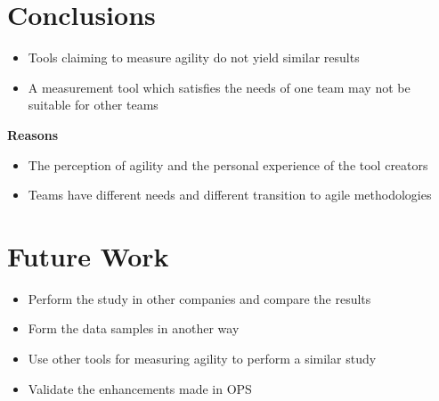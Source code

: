 \section{Conclusions}

\begin{itemize}
	\item Tools claiming to measure agility do not yield similar results
	\item A measurement tool which satisfies the needs of one team may not be suitable for other teams  
\end{itemize}

\textbf{Reasons}
\begin{itemize}
	\item The perception of agility and the personal experience of the tool creators
	\item Teams have different needs and different transition to agile methodologies
\end{itemize}

\clearpage

\section{Future Work}

\begin{itemize}
	\item Perform the study in other companies and compare the results
	\item Form the data samples in another way
	\item Use other tools for measuring agility to perform a similar study
	\item Validate the enhancements made in OPS
\end{itemize}

\clearpage